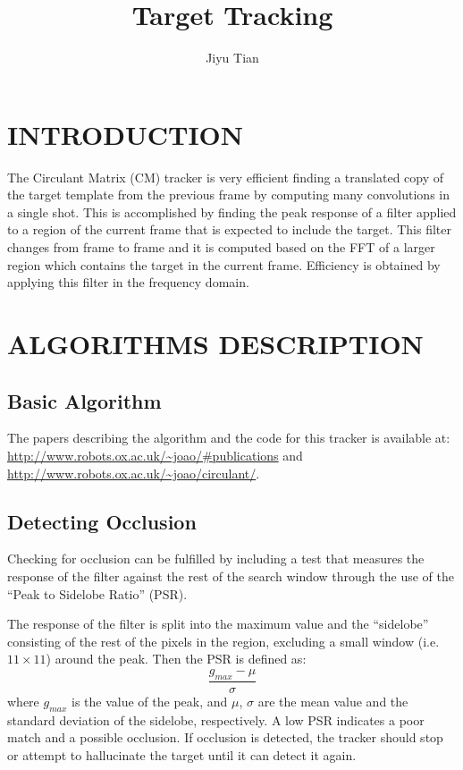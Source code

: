 \documentclass[letterpaper, 10 pt, conference]{ieeeconf}
\title{\Huge Target Tracking}
\author{Jiyu Tian}
\begin{document}
\maketitle
\thispagestyle{empty}
\pagestyle{empty}




\section{INTRODUCTION}
The Circulant Matrix (CM) tracker is very efficient finding a translated copy of the target template from the previous frame by computing many convolutions in a single shot. This is accomplished by finding the peak response of a filter applied to a region of the current frame that is expected to include the target. This filter changes from frame to frame and it is computed based on the FFT of a larger region which contains the target in the current frame. Efficiency is obtained by applying this filter in the frequency domain. 



\section{ALGORITHMS DESCRIPTION}

\subsection{Basic Algorithm}
The papers describing the algorithm and the code for this tracker is available at:
\url{http://www.robots.ox.ac.uk/~joao/#publications}
and
\url{http://www.robots.ox.ac.uk/~joao/circulant/}.

\subsection{Detecting Occlusion}
Checking for occlusion can be fulfilled by including a test that measures the response of the filter against the rest of the search window through the use of the ``Peak to Sidelobe Ratio'' (PSR).


The response of the filter is split into the maximum value and the “sidelobe” consisting of the rest of the pixels in the region, excluding a small window (i.e. $11 \times 11$) around the peak. Then the PSR is defined as:
\begin{equation}
    \frac{g_{max} - \mu}{\sigma}
\end{equation}
where $g_{max}$ is the value of the peak, and $\mu$, $\sigma$ are the mean value and the standard deviation of the sidelobe, respectively. A low PSR indicates a poor match and a possible occlusion. If occlusion is detected, the tracker should stop or attempt to hallucinate the target until it can detect it again.
\end{document}
